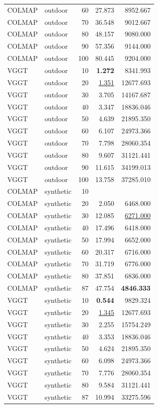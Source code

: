 \begin{table}[H]
\begin{tabular}{llrrr}
COLMAP & outdoor & 60 & 27.873 & 8952.667 \\
COLMAP & outdoor & 70 & 36.548 & 9012.667 \\
COLMAP & outdoor & 80 & 48.157 & 9080.000 \\
COLMAP & outdoor & 90 & 57.356 & 9144.000 \\
COLMAP & outdoor & 100 & 80.445 & 9204.000 \\
VGGT & outdoor & 10 & \textbf{1.272} & 8341.993 \\
VGGT & outdoor & 20 & \underline{1.351} & 12677.693 \\
VGGT & outdoor & 30 & 3.705 & 14167.687 \\
VGGT & outdoor & 40 & 3.347 & 18836.046 \\
VGGT & outdoor & 50 & 4.639 & 21895.350 \\
VGGT & outdoor & 60 & 6.107 & 24973.366 \\
VGGT & outdoor & 70 & 7.798 & 28060.354 \\
VGGT & outdoor & 80 & 9.607 & 31121.441 \\
VGGT & outdoor & 90 & 11.615 & 34199.013 \\
VGGT & outdoor & 100 & 13.758 & 37285.010 \\
\midrule
COLMAP & synthetic & 10 &  &  \\
COLMAP & synthetic & 20 & 2.050 & 6468.000 \\
COLMAP & synthetic & 30 & 12.085 & \underline{6271.000} \\
COLMAP & synthetic & 40 & 17.496 & 6418.000 \\
COLMAP & synthetic & 50 & 17.994 & 6652.000 \\
COLMAP & synthetic & 60 & 20.317 & 6716.000 \\
COLMAP & synthetic & 70 & 31.719 & 6776.000 \\
COLMAP & synthetic & 80 & 37.851 & 6836.000 \\
COLMAP & synthetic & 87 & 47.754 & \textbf{4846.333} \\
VGGT & synthetic & 10 & \textbf{0.544} & 9829.324 \\
VGGT & synthetic & 20 & \underline{1.345} & 12677.693 \\
VGGT & synthetic & 30 & 2.255 & 15754.249 \\
VGGT & synthetic & 40 & 3.353 & 18836.046 \\
VGGT & synthetic & 50 & 4.624 & 21895.350 \\
VGGT & synthetic & 60 & 6.098 & 24973.366 \\
VGGT & synthetic & 70 & 7.776 & 28060.354 \\
VGGT & synthetic & 80 & 9.584 & 31121.441 \\
VGGT & synthetic & 87 & 10.994 & 33275.596 \\
\bottomrule
\end{tabular}
\end{table}